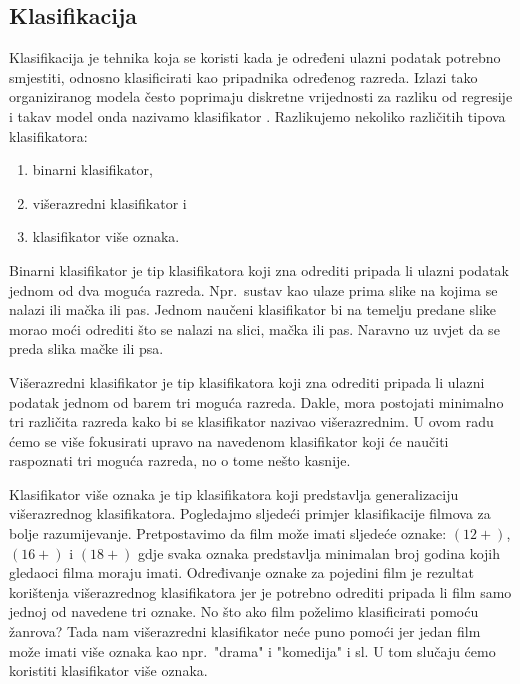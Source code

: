 \documentclass[times, utf8, zavrsni]{fer}
\begin{document}
\subsection{Klasifikacija}
\label{chap:classification}
Klasifikacija  je tehnika koja se koristi kada je određeni ulazni podatak potrebno smjestiti, odnosno klasificirati kao pripadnika određenog razreda. Izlazi tako organiziranog modela često poprimaju diskretne vrijednosti za razliku od regresije i takav model onda nazivamo klasifikator . Razlikujemo nekoliko različitih tipova klasifikatora:

\begin{enumerate}
    \item binarni klasifikator,
    \item višerazredni klasifikator i
    \item klasifikator više oznaka.
\end{enumerate}

\smallskip

Binarni klasifikator  je tip klasifikatora koji zna odrediti pripada li ulazni podatak jednom od dva moguća razreda. Npr.\ sustav kao ulaze prima slike na kojima se nalazi ili mačka ili pas. Jednom naučeni klasifikator bi na temelju predane slike morao moći odrediti što se nalazi na slici, mačka ili pas. Naravno uz uvjet da se preda slika mačke ili psa.

Višerazredni klasifikator  je tip klasifikatora koji zna odrediti pripada li ulazni podatak jednom od barem tri moguća razreda. Dakle, mora postojati minimalno tri različita razreda kako bi se klasifikator nazivao višerazrednim. U ovom radu ćemo se više fokusirati upravo na navedenom klasifikator koji će naučiti raspoznati tri moguća razreda, no o tome nešto kasnije.

Klasifikator više oznaka  je tip klasifikatora koji predstavlja generalizaciju višerazrednog klasifikatora. Pogledajmo sljedeći primjer klasifikacije filmova za bolje razumijevanje. Pretpostavimo da film može imati sljedeće oznake: $(12+)$, $(16+)$ i $(18+)$ gdje svaka oznaka predstavlja minimalan broj godina kojih gledaoci filma moraju imati. Određivanje oznake za pojedini film je rezultat korištenja višerazrednog klasifikatora jer je potrebno odrediti pripada li film samo jednoj od navedene tri oznake. No što ako film poželimo klasificirati pomoću žanrova? Tada nam višerazredni klasifikator neće puno pomoći jer jedan film može imati više oznaka kao npr.\ "drama" i "komedija" i sl. U tom slučaju ćemo koristiti klasifikator više oznaka.
\end{document}

